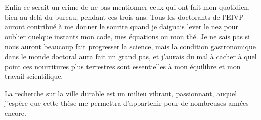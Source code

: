 Enfin ce serait un crime de ne pas mentionner ceux qui ont fait mon quotidien, bien au-delà du bureau, pendant ces trois ans. Tous les doctorants de l'EIVP auront contribué à me donner le sourire quand je daignais lever le nez pour oublier quelque instants mon code, mes équations ou mon thé. Je ne sais pas si nous auront beaucoup fait progresser la science, mais la condition gastronomique dans le monde doctoral aura fait un grand pas, et j'aurais du mal à cacher à quel point ces nourritures plus terrestres sont essentielles à mon équilibre et mon travail scientifique.

La recherche sur la ville durable est un milieu vibrant, passionnant, auquel j’espère que cette thèse me permettra d'appartenir pour de nombreuses années encore.

